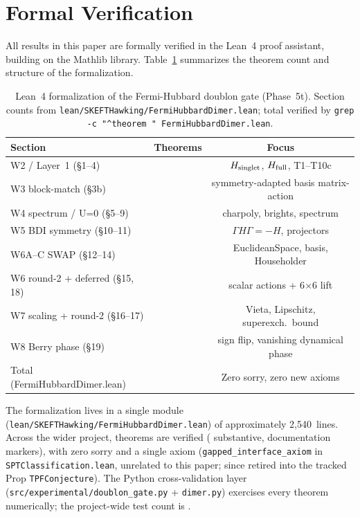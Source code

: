 \documentclass[aps,prd,twocolumn,showpacs,superscriptaddress,nofootinbib]{revtex4-2}
\begin{document}
\section{Formal Verification}
\label{sec:lean}

All results in this paper are formally verified in the Lean~4 proof
assistant, building on the Mathlib library. Table~\ref{tab:lean}
summarizes the theorem count and structure of the formalization.

\begin{table}[t]
\caption{Lean~4 formalization of the Fermi-Hubbard doublon gate
(Phase~5t). Section counts from
\texttt{lean/SKEFTHawking/FermiHubbardDimer.lean}; total verified by
\texttt{grep -c "\textasciicircum theorem " FermiHubbardDimer.lean}.}
\label{tab:lean}
\begin{ruledtabular}
\begin{tabular}{lcc}
Section & Theorems & Focus \\
\hline
W2 / Layer~1 (\S 1--4) & \fhdWaveTwo{} & $H_{\rm singlet}$, $H_{\rm full}$, T1--T10c \\
W3 block-match (\S 3b) & \fhdWaveThree{} & symmetry-adapted basis matrix-action \\
W4 spectrum / U=0 (\S 5--9) & \fhdWaveFour{} & charpoly, brights, spectrum \\
W5 BDI symmetry (\S 10--11) & \fhdWaveFive{} & $\Gamma H \Gamma = -H$, projectors \\
W6A--C SWAP (\S 12--14) & \fhdWaveSixABC{} & EuclideanSpace, basis, Householder \\
W6 round-2 + deferred (\S 15, 18) & \fhdWaveSixExtra{} & scalar actions + 6$\times$6 lift \\
W7 scaling + round-2 (\S 16--17) & \fhdWaveSeven{} & Vieta, Lipschitz, superexch.\ bound \\
W8 Berry phase (\S 19) & \fhdWaveEight{} & sign flip, vanishing dynamical phase \\
\hline
Total (FermiHubbardDimer.lean) & \fhdTotal{} & Zero sorry, zero new axioms \\
\end{tabular}
\end{ruledtabular}
\end{table}

The formalization lives in a single module
(\texttt{lean/SKEFTHawking/FermiHubbardDimer.lean}) of approximately
2,540~lines. Across the wider project, \totaltheorems{} theorems are
verified (\substantivetheorems{} substantive, \placeholdertheorems{}
documentation markers), with zero sorry and a single axiom
(\texttt{gapped\_interface\_axiom} in
\texttt{SPTClassification.lean}, unrelated to this paper; since
retired into the tracked Prop \texttt{TPFConjecture}). The Python
cross-validation layer
(\texttt{src/experimental/doublon\_gate.py} + \texttt{dimer.py})
exercises every theorem numerically; the project-wide test count is
\totaltests{}.
\end{document}
